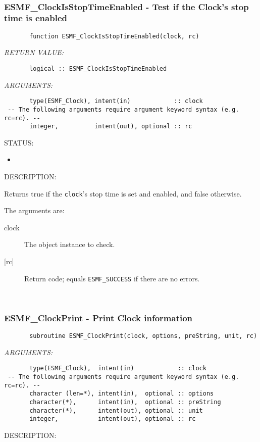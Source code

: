 \mbox{}\hrulefill\ 
 
\subsubsection [ESMF\_ClockIsStopTimeEnabled] {ESMF\_ClockIsStopTimeEnabled - Test if the Clock's stop time is enabled}


 
\begin{verbatim}       function ESMF_ClockIsStopTimeEnabled(clock, rc)\end{verbatim}{\em RETURN VALUE:}
\begin{verbatim}       logical :: ESMF_ClockIsStopTimeEnabled
 \end{verbatim}{\em ARGUMENTS:}
\begin{verbatim}       type(ESMF_Clock), intent(in)            :: clock
 -- The following arguments require argument keyword syntax (e.g. rc=rc). --
       integer,          intent(out), optional :: rc
 \end{verbatim}
{\sf STATUS:}
   \begin{itemize}
   \item{}
   \end{itemize}
  
{\sf DESCRIPTION:\\ }


       Returns true if the {\tt clock}'s stop time is set and enabled,
       and false otherwise.
  
       The arguments are:
       \begin{description}
       \item[clock]
            The object instance to check.
       \item[{[rc]}]
            Return code; equals {\tt ESMF\_SUCCESS} if there are no errors.
       \end{description} 
 
\mbox{}\hrulefill\ 
 
\subsubsection [ESMF\_ClockPrint] {ESMF\_ClockPrint - Print Clock information}


 
\begin{verbatim}       subroutine ESMF_ClockPrint(clock, options, preString, unit, rc)
 \end{verbatim}{\em ARGUMENTS:}
\begin{verbatim}       type(ESMF_Clock),  intent(in)            :: clock
 -- The following arguments require argument keyword syntax (e.g. rc=rc). --
       character (len=*), intent(in),  optional :: options
       character(*),      intent(in),  optional :: preString
       character(*),      intent(out), optional :: unit
       integer,           intent(out), optional :: rc
 \end{verbatim}
{\sf DESCRIPTION:\\ }



